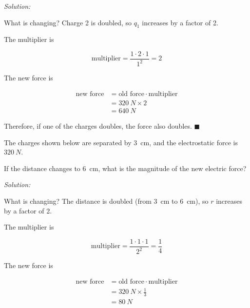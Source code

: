\documentclass[dvipsnames]{article}
\begin{document}
\textit{Solution:}

What is changing? Charge 2 is doubled, so $q_1$ increases by a factor of 2.

The multiplier is

\begin{equation*}
    \text{multiplier} = \frac{1\cdot 2 \cdot 1}{1^2} = 2
\end{equation*}

The new force is

\begin{align*}
    \text{new force} &= \text{old force} \cdot \text{multiplier} \\[1ex]
    &= \SI{320}{N} \times 2 \\[1ex]
    &= \boxed{\SI{640}{N}}
\end{align*}

Therefore, if one of the charges doubles, the force also doubles. \hfill $\blacksquare$

\begin{example}
The charges shown below are separated by \SI{3}{cm}, and the electrostatic force is $\SI{320}{N}$.

\begin{center}
\end{center}

If the distance changes to \SI{6}{cm}, what is the magnitude of the new electric force?
\end{example}

\textit{Solution:}

What is changing? The distance is doubled (from \SI{3}{cm} to \SI{6}{cm}), so $r$ increases by a factor of 2.

The multiplier is

\begin{equation*}
    \text{multiplier} = \frac{1\cdot 1 \cdot 1}{2^2} = \frac{1}{4}
\end{equation*}

The new force is

\begin{align*}
    \text{new force} &= \text{old force} \cdot \text{multiplier} \\[1ex]
    &= \SI{320}{N} \times \frac{1}{3} \\[1ex]
    &= \boxed{\SI{80}{N}}
\end{align*}
\end{document}
